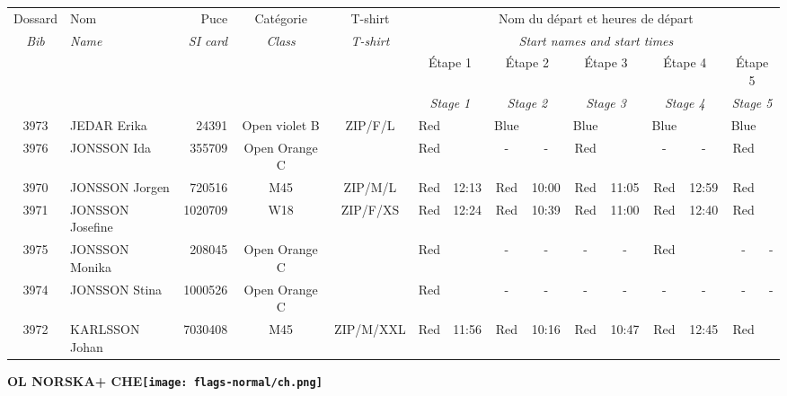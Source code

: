 \documentclass{report}
\begin{document}
  \begin{longtable}{|c|l|r|c|c|*{5}{cc|}}
    Dossard & Nom  & Puce    & Catégorie & T-shirt & \multicolumn{10}{c|}{Nom du départ et heures de départ} \\
    \itshape Bib     & \itshape Name & \itshape SI card & \itshape Class  & \itshape  T-shirt  & \multicolumn{10}{c|}{\itshape Start names and start times} \\
    \hline
    & & & & & \multicolumn{2}{c|}{Étape 1} & \multicolumn{2}{c|}{Étape 2} & \multicolumn{2}{c|}{Étape 3} & \multicolumn{2}{c|}{Étape 4} & \multicolumn{2}{c|}{Étape 5} \\
    & & & & & \multicolumn{2}{c|}{\itshape Stage 1} & \multicolumn{2}{c|}{\itshape Stage 2} & \multicolumn{2}{c|}{\itshape Stage 3} & \multicolumn{2}{c|}{\itshape Stage 4} & \multicolumn{2}{c|}{\itshape Stage 5} \\
    \hline
    3973 & JEDAR Erika & 24391 & Open violet B & ZIP/F/L & Red &   & Blue &   & Blue &   & Blue &   & Blue &  \\
    3976 & JONSSON Ida & 355709 & Open Orange C &   & Red &   & - &  - & Red &   & - &  - & Red &  \\
    3970 & JONSSON Jorgen & 720516 & M45 & ZIP/M/L & Red & 12:13 & Red & 10:00 & Red & 11:05 & Red & 12:59 & Red &  \\
    3971 & JONSSON Josefine & 1020709 & W18 & ZIP/F/XS & Red & 12:24 & Red & 10:39 & Red & 11:00 & Red & 12:40 & Red &  \\
    3975 & JONSSON Monika & 208045 & Open Orange C &   & Red &   & - &  - & - &  - & Red &   & - &  -\\
    3974 & JONSSON Stina & 1000526 & Open Orange C &   & Red &   & - &  - & - &  - & - &  - & - &  -\\
    3972 & KARLSSON Johan & 7030408 & M45 & ZIP/M/XXL & Red & 11:56 & Red & 10:16 & Red & 10:47 & Red & 12:45 & Red &  \\
  \end{longtable}
\newpage
  \Huge \centering \bfseries OL NORSKA+  CHE\normalfont \footnotesize \sffamily \hfill \texttt{[image: flags-normal/ch.png]} \newline 
\end{document}
